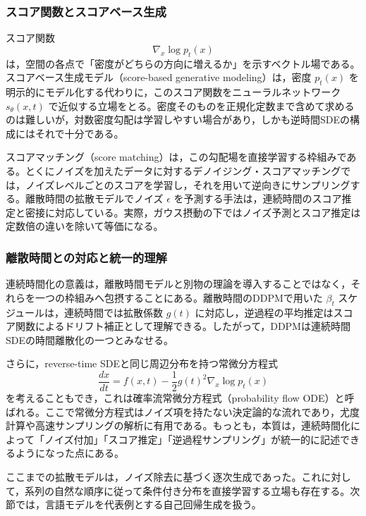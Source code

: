 \subsubsection{スコア関数とスコアベース生成}

スコア関数
\begin{equation}
\nabla_x \log p_t(x)
\end{equation}
は，空間の各点で「密度がどちらの方向に増えるか」を示すベクトル場である。スコアベース生成モデル（score-based generative modeling）\cite{Song2019}は，密度 \(p_t(x)\) を明示的にモデル化する代わりに，このスコア関数をニューラルネットワーク \(s_{\theta}(x,t)\) で近似する立場をとる。密度そのものを正規化定数まで含めて求めるのは難しいが，対数密度勾配は学習しやすい場合があり，しかも逆時間SDEの構成にはそれで十分である。

スコアマッチング（score matching）は，この勾配場を直接学習する枠組みである。とくにノイズを加えたデータに対するデノイジング・スコアマッチングでは，ノイズレベルごとのスコアを学習し，それを用いて逆向きにサンプリングする。離散時間の拡散モデルでノイズ \(\epsilon\) を予測する手法は，連続時間のスコア推定と密接に対応している。実際，ガウス摂動の下ではノイズ予測とスコア推定は定数倍の違いを除いて等価になる。

\subsubsection{離散時間との対応と統一的理解}

連続時間化の意義は，離散時間モデルと別物の理論を導入することではなく，それらを一つの枠組みへ包摂することにある。離散時間のDDPMで用いた \(\beta_t\) スケジュールは，連続時間では拡散係数 \(g(t)\) に対応し，逆過程の平均推定はスコア関数によるドリフト補正として理解できる。したがって，DDPMは連続時間SDEの時間離散化の一つとみなせる。

さらに，reverse-time SDEと同じ周辺分布を持つ常微分方程式
\begin{equation}
\frac{dx}{dt}
=
f(x,t)-\frac{1}{2}g(t)^2\nabla_x \log p_t(x)
\end{equation}
を考えることもでき，これは確率流常微分方程式（probability flow ODE）と呼ばれる。ここで常微分方程式はノイズ項を持たない決定論的な流れであり，尤度計算や高速サンプリングの解析に有用である。もっとも，本質は，連続時間化によって「ノイズ付加」「スコア推定」「逆過程サンプリング」が統一的に記述できるようになった点にある。

ここまでの拡散モデルは，ノイズ除去に基づく逐次生成であった。これに対して，系列の自然な順序に従って条件付き分布を直接学習する立場も存在する。次節では，言語モデルを代表例とする自己回帰生成を扱う。

